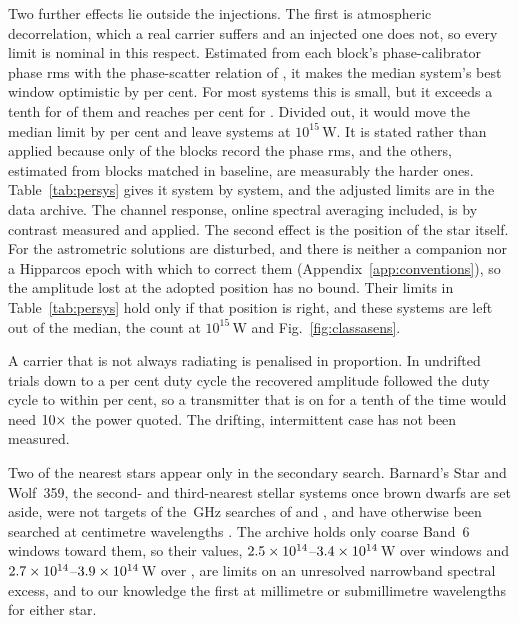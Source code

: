 Two further effects lie outside the injections. The first is atmospheric
decorrelation, which a real carrier suffers and an injected one does not, so
every limit is nominal in this respect. Estimated from each block's
phase-calibrator phase rms \citep[\S\S10.4.11, 11.3.1]{ALMAHandbook} with the
phase-scatter relation of \citet[Eq.~3]{Richards2022}, it makes the median
system's best window optimistic by \NmDecSysMedPct{} per cent. For most
systems this is small, but it exceeds a tenth for \NmDecNBigSys{} of them and
reaches \NmDecSysWorstPct{} per cent for \NmDecSysWorstName. Divided out, it
would move the median limit by \NmDecAdjShiftPct{} per cent and leave
\NmDecAdjNEfifteen{} systems at $10^{15}$\,W. It is stated rather than
applied because only \SensDecorNBlk{} of the \SensDecorNBlkTot{} blocks
record the phase rms, and the others, estimated from blocks matched in
baseline, are measurably the harder ones. Table~\ref{tab:persys} gives it
system by system, and the adjusted limits are in the data archive. The
channel response, online spectral averaging included, is by contrast
measured and applied. The second effect is the position of the star itself.
For \OmFlagStars{} the astrometric solutions are disturbed, and there is
neither a companion nor a Hipparcos epoch with which to correct them
(Appendix~\ref{app:conventions}), so the amplitude lost at the adopted
position has no bound. Their limits in Table~\ref{tab:persys} hold only if
that position is right, and these \OmNFlagWord{} systems are left out of the
median, the count at $10^{15}$\,W and Fig.~\ref{fig:classasens}.

A carrier that is not always radiating is penalised in proportion. In
\DutyNTrial{} undrifted trials down to a \DutyCycleMinPct{} per cent duty
cycle the recovered amplitude followed the duty cycle to within
\DutyAttenDevPct{} per cent, so a transmitter that is on for a tenth of the
time would need $10\times$ the power quoted. The drifting,
intermittent case has not been measured.

Two of the nearest stars appear only in the secondary search. Barnard's Star and Wolf~359, the second-
and third-nearest stellar systems once brown dwarfs are set aside, were not
targets of the \SbPriorFreqGHz\,GHz searches of \citet{Steffes1994} and
\citet{Mauersberger1996}, and have otherwise been searched at centimetre
wavelengths \citep{Enriquez2017,Price2020,Margot2023}. The archive holds only
coarse Band~6 windows toward them, so their values,
$2.5\times10^{14}$--$3.4\times10^{14}$\,W over \NWinBarn{} windows and
$2.7\times10^{14}$--$3.9\times10^{14}$\,W over \NWinWolf, are limits on an
unresolved narrowband spectral excess, and to our knowledge the first at
millimetre or submillimetre wavelengths for either star.

